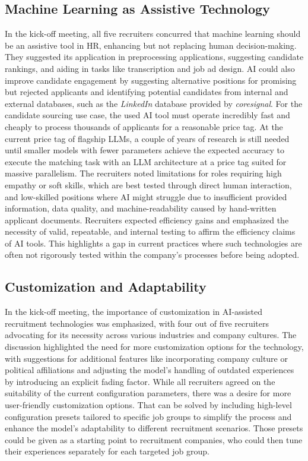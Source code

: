 \documentclass[draft,final]{thesisclass} %
\begin{document}
\subsection{Machine Learning as Assistive Technology} \label{interpretation_ml_as_assistive_technology}
In the kick-off meeting, all five recruiters concurred that machine learning should be an assistive tool in \acs{HR}, enhancing but not replacing human decision-making. They suggested its application in preprocessing applications, suggesting candidate rankings, and aiding in tasks like transcription and job ad design. \acs{AI} could also improve candidate engagement by suggesting alternative positions for promising but rejected applicants and identifying potential candidates from internal and external databases, such as the \textit{LinkedIn} database provided by \textit{coresignal}. For the candidate sourcing use case, the used \acs{AI} tool must operate incredibly fast and cheaply to process thousands of applicants for a reasonable price tag. At the current price tag of flagship \gls{LLM}s, a couple of years of research is still needed until smaller models with fewer parameters achieve the expected accuracy to execute the matching task with an \gls{LLM} architecture at a price tag suited for massive parallelism. The recruiters noted limitations for roles requiring high empathy or soft skills, which are best tested through direct human interaction, and low-skilled positions where \acs{AI} might struggle due to insufficient provided information, data quality, and machine-readability caused by hand-written applicant documents. Recruiters expected efficiency gains and emphasized the necessity of valid, repeatable, and internal testing to affirm the efficiency claims of \acs{AI} tools. This highlights a gap in current practices where such technologies are often not rigorously tested within the company's processes before being adopted.

\subsection{Customization and Adaptability}
In the kick-off meeting, the importance of customization in \acs{AI}-assisted recruitment technologies was emphasized, with four out of five recruiters advocating for its necessity across various industries and company cultures. The discussion highlighted the need for more customization options for the technology, with suggestions for additional features like incorporating company culture or political affiliations and adjusting the model's handling of outdated experiences by introducing an explicit fading factor. While all recruiters agreed on the suitability of the current configuration parameters, there was a desire for more user-friendly customization options. That can be solved by including high-level configuration presets tailored to specific job groups to simplify the process and enhance the model's adaptability to different recruitment scenarios. Those presets could be given as a starting point to recruitment companies, who could then tune their experiences separately for each targeted job group.
\end{document}
